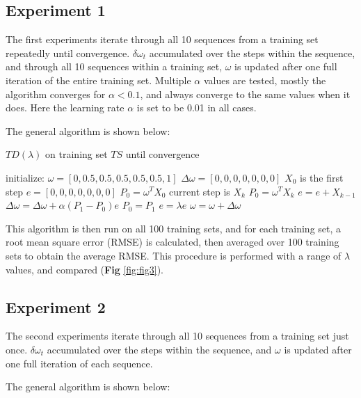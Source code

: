 \documentclass[10pt]{article}
\begin{document}



\subsection{Experiment 1} \label{experiment1}
The first experiments iterate through all 10 sequences from a training set repeatedly until convergence. $\delta \omega_t$ accumulated over the steps within the sequence, and through all 10 sequences within a training set, $\omega$ is updated after one full iteration of the entire training set. Multiple $\alpha$ values are tested, mostly the algorithm converges for $\alpha<0.1$, and always converge to the same values when it does. Here the learning rate $\alpha$ is set to be 0.01 in all cases.\par
\noindent
The general algorithm is shown below:\par

\begin{algorithm}
\caption{$TD(\lambda)$ on training set $TS$ until convergence}
\begin{algorithmic}
\STATE initialize: $\omega=[0,0.5,0.5,0.5,0.5,0.5,1]$
\REPEAT
\STATE $\Delta\omega=[0,0,0,0,0,0,0]$
\STATE $X_0$ is the first step
\STATE $e=[0,0,0,0,0,0,0]$
\STATE $P_0=\omega^T X_0$
\STATE current step is $X_k$
\STATE $P_0=\omega^T X_k$
\STATE $e=e+X_{k-1}$
\STATE $\Delta\omega=\Delta\omega+\alpha (P_1-P_0)e$
\STATE $P_0=P_1$
\STATE $e=\lambda e$
\ENDFOR
\ENDFOR
\STATE $\omega=\omega+\Delta\omega$
\UNTIL{$\Delta\omega<\epsilon$}
\end{algorithmic}
\end{algorithm}

This algorithm is then run on all 100 training sets, and for each training set, a root mean square error (RMSE) is calculated, then averaged over 100 training sets to obtain the average RMSE. This procedure is performed with a range of $\lambda$ values, and compared (\textbf{Fig} \ref{fig:fig3}).





\subsection{Experiment 2} \label{experiment2}
The second experiments iterate through all 10 sequences from a training set just once. $\delta \omega_t$ accumulated over the steps within the sequence, and $\omega$ is updated after one full iteration of each sequence.\par
\noindent
The general algorithm is shown below:\par
\end{document}
